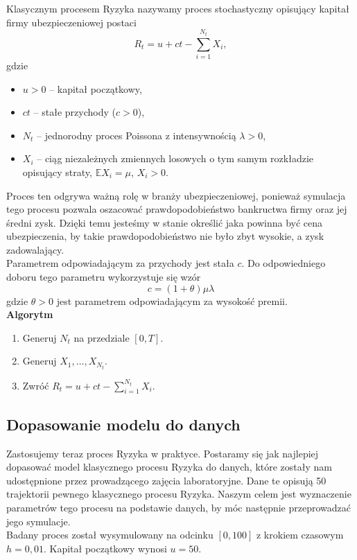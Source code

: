 \documentclass[12pt]{mwart}
\begin{document}
	\noindent Klasycznym procesem Ryzyka nazywamy proces stochastyczny opisujący kapitał firmy ubezpieczeniowej postaci
	$$ R_t = u + ct - \sum_{i=1}^{N_t} X_i, $$
	gdzie
	\begin{itemize}[leftmargin=10mm, label={\small$\bullet$}]
		\item $u > 0$ -- kapitał początkowy,
		\item $ct$ -- stałe przychody ($c > 0$),
		\item $N_t$ -- jednorodny proces Poissona z intensywnością $\lambda > 0$,
		\item $X_i$ -- ciąg niezależnych zmiennych losowych o tym samym rozkładzie opisujący straty, $\mathbb{E}X_i = \mu$, $X_i > 0$.
	\end{itemize}
	Proces ten odgrywa ważną rolę w branży ubezpieczeniowej, ponieważ symulacja tego procesu pozwala oszacować prawdopodobieństwo bankructwa firmy oraz jej średni zysk. Dzięki temu jesteśmy w stanie określić jaka powinna być cena ubezpieczenia, by takie prawdopodobieństwo nie było zbyt wysokie, a zysk zadowalający.\vspace{1.5mm}\\
	Parametrem odpowiadającym za przychody jest stała $c$. Do odpowiedniego doboru tego parametru wykorzystuje się wzór
	\begin{equation}\label{c}
		c = (1 + \theta)\mu\lambda
	\end{equation}
	gdzie $\theta > 0$ jest parametrem odpowiadającym za wysokość premii.\\
	
	\noindent \textbf{Algorytm}
	\begin{enumerate}[leftmargin=10mm]
		\item Generuj $N_t$ na przedziale $[0, T]$.
		\item Generuj $X_1, \dots, X_{N_t}$.
		\item Zwróć $R_t = u + ct - \sum\limits_{i=1}^{N_t} X_i$.
	\end{enumerate}
	
	
	
	\subsection{Dopasowanie modelu do danych}
	
	\noindent Zastosujemy teraz proces Ryzyka w praktyce. Postaramy się jak najlepiej dopasować model klasycznego procesu Ryzyka do danych, które zostały nam udostępnione przez prowadzącego zajęcia laboratoryjne. Dane te opisują 50 trajektorii pewnego klasycznego procesu Ryzyka. Naszym celem jest wyznaczenie parametrów tego procesu na podstawie danych, by móc następnie przeprowadzać jego symulacje.\vspace{1.5mm}\\
	Badany proces został wysymulowany na odcinku $[0, 100]$ z krokiem czasowym $h = 0,01$. Kapitał początkowy wynosi $u = 50$.
	
\end{document}
